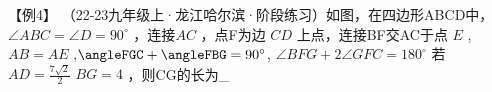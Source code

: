 【例4】 （22-23九年级上·龙江哈尔滨·阶段练习）如图，在四边形ABCD中，
\(\angle A B C = \angle D = 90 ^ { \circ }\) ，连接\(A C\) ，点F为边
\(C D\) 上点，连接BF交AC于点 \(E\) , \(A B = A E\)
,\(\angleFGC+\angleFBG=90^{\circ}\),
\(\angle B F G + 2 \angle G F C = 18 0 ^ { \circ }\) 若
\(A D = \frac { 7 \sqrt { 2 } } { 2 }\) \(B G = 4\) ，则CG的长为\_

